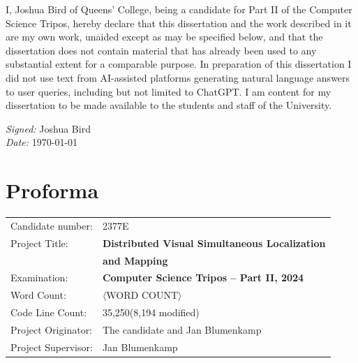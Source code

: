 \documentclass[12pt,a4paper,twoside,openright]{report}
\begin{document}
I, Joshua Bird of Queens' College, being a candidate for Part II of the Computer Science Tripos, hereby declare that this dissertation and the work described in it are my own work, unaided except as may be specified below, and that the dissertation does not contain material that has already been used to any substantial extent for a comparable purpose. In preparation of this dissertation I did not use text from AI-assisted platforms generating natural language answers to user queries, including but not limited to ChatGPT. I am content for my dissertation to be made available to the students and staff of the University.

\emph{Signed:} Joshua Bird\\
\emph{Date:} \today

\chapter*{Proforma}
 {\large
  \begin{tabular}{ll}
	  Candidate number:   & 2377E                                                   \\
	  Project Title:      & \bf Distributed Visual Simultaneous Localization        \\
	                      & \bf and Mapping                                         \\
	  Examination:        & \bf Computer Science Tripos -- Part II, 2024            \\
	  Word Count:         & \(\langle\)WORD COUNT\(\rangle\)\footnotemark[1]        \\
	  Code Line Count:    & 35,250\footnotemark[2] (8,194 modified\footnotemark[3]) \\
	  Project Originator: & The candidate and Jan Blumenkamp                        \\
	  Project Supervisor: & Jan Blumenkamp                                          \\
  \end{tabular}
 }
\end{document}
